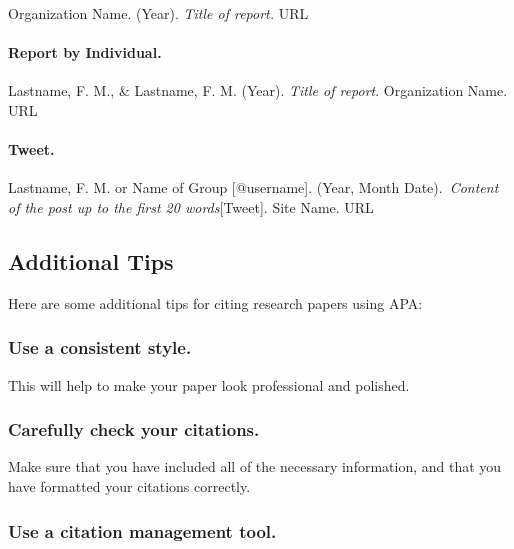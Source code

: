\documentclass[
  b5paper]{book}
\begin{document}
Organization Name. (Year). \emph{Title of report.} URL

\hypertarget{report-by-individual.}{%
\paragraph*{Report by Individual.}\label{report-by-individual.}}

Lastname, F. M., \& Lastname, F. M. (Year). \emph{Title of report}. Organization Name. URL

\hypertarget{tweet.}{%
\paragraph*{Tweet.}\label{tweet.}}

Lastname, F. M. or Name of Group {[}@username{]}. (Year, Month Date).~\emph{Content of the post up to the first 20 words}{[}Tweet{]}. Site Name. URL

\hypertarget{additional-tips-2}{%
\subsection*{Additional Tips}\label{additional-tips-2}}

Here are some additional tips for citing research papers using APA:

\hypertarget{use-a-consistent-style.}{%
\subsubsection*{Use a consistent style.}\label{use-a-consistent-style.}}

This will help to make your paper look professional and polished.

\hypertarget{carefully-check-your-citations.}{%
\subsubsection*{Carefully check your citations.}\label{carefully-check-your-citations.}}

Make sure that you have included all of the necessary information, and that you have formatted your citations correctly.

\hypertarget{use-a-citation-management-tool.}{%
\subsubsection*{Use a citation management tool.}\label{use-a-citation-management-tool.}}
\end{document}
